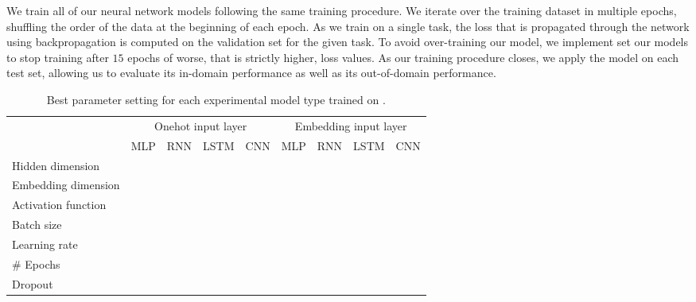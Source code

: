 We train all of our neural network models following the same training procedure. We iterate over the training dataset in multiple epochs, shuffling the order of the data at the beginning of each epoch. As we train on a single task, the loss that is propagated through the network using backpropagation is computed on the validation set for the given task. To avoid over-training our model, we implement set our models to stop training after $15$ epochs of worse, that is strictly higher, loss values. As our training procedure closes, we apply the model on each test set, allowing us to evaluate its in-domain performance as well as its out-of-domain performance.


\begin{table}[]
\centering
\begin{tabular}{lllll|llll}
                    & \multicolumn{4}{c|}{Onehot input layer} & \multicolumn{4}{c}{Embedding input layer}\\
                    & MLP     & RNN     & LSTM     & CNN     & MLP      & RNN      & LSTM      & CNN     \\\hline
Hidden dimension    &         &         &          &         &          &          &           &         \\
Embedding dimension &         &         &          &         &          &          &           &         \\
Activation function &         &         &          &         &          &          &           &         \\
Batch size          &         &         &          &         &          &          &           &         \\
Learning rate       &         &         &          &         &          &          &           &         \\
# Epochs            &         &         &          &         &          &          &           &         \\
Dropout             &         &         &          &         &          &          &           &
\end{tabular}
\caption{Best parameter setting for each experimental model type trained on \citet{Davidson:2017}.}
\label{tab:exp_model_parameters_davidson}
\end{table}

